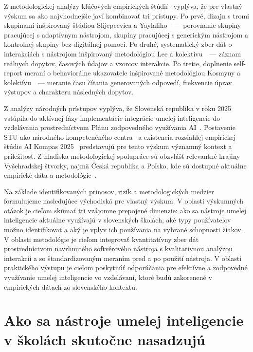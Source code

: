 Z metodologickej analýzy kľúčových empirických štúdií~\cite{kestin2025aitutoring,lee2025genai,gerlich2025offloading,slijepcevic2025khanmigo,kosmyna2025brain} vyplýva, že pre vlastný výskum sa ako najvhodnejšie javí kombinovať tri prístupy. Po prvé, dizajn s tromi skupinami inšpirovaný štúdiou Slijepcevica a Yaylaliho~\cite{slijepcevic2025khanmigo}~--- porovnanie skupiny pracujúcej s adaptívnym nástrojom, skupiny pracujúcej s generickým nástrojom a kontrolnej skupiny bez digitálnej pomoci. Po druhé, systematický zber dát o interakciách s nástrojom inšpirovaný metodológiou Lee a kolektívu~\cite{lee2025genai}~--- záznam reálnych dopytov, časových údajov a vzorcov interakcie. Po tretie, doplnenie self-report meraní o behaviorálne ukazovatele inšpirované metodológiou Kosmyny a kolektívu~\cite{kosmyna2025brain}~--- meranie času čítania generovaných odpovedí, frekvencie úprav výstupov a charakteru následných dopytov.

Z analýzy národných prístupov vyplýva, že Slovenská republika v roku 2025 vstúpila do aktívnej fázy implementácie integrácie umelej inteligencie do vzdelávania prostredníctvom Plánu zodpovedného využívania AI~\cite{minedu2025plan}. Postavenie STU ako národného kompetenčného centra~\cite{drucker2026competence} a existencia rozsiahlej empirickej štúdie AI Kompas 2025~\cite{scio2025aikompas} predstavujú pre tento výskum významný kontext a príležitosť. Z hľadiska metodologickej spolupráce sú obzvlášť relevantné krajiny Vyšehradskej štvorky, najmä Česká republika a Poľsko, kde sú dostupné aktuálne empirické dáta a metodológie~\cite{kopecky2026inevitable,tomczyk2025polish}.

Na základe identifikovaných prínosov, rizík a metodologických medzier formulujeme nasledujúce východiská pre vlastný výskum. V oblasti výskumných otázok je cieľom skúmať tri vzájomne prepojené dimenzie: ako sa nástroje umelej inteligencie aktuálne využívajú v slovenských školách, aké typy používateľov možno identifikovať a aký je vplyv ich používania na vybrané schopnosti žiakov. V oblasti metodológie je cieľom integrovať kvantitatívny zber dát prostredníctvom navrhnutého softvérového nástroja s kvalitatívnou analýzou interakcií a so štandardizovaným meraním pred a po použití nástroja. V oblasti praktického výstupu je cieľom poskytnúť odporúčania pre efektívne a zodpovedné využívanie umelej inteligencie vo vzdelávaní, ktoré budú zakorenené v empirických dátach zo slovenského kontextu.


\section{Ako sa nástroje umelej inteligencie v školách skutočne nasadzujú}
\label{sec:nasadenie}


